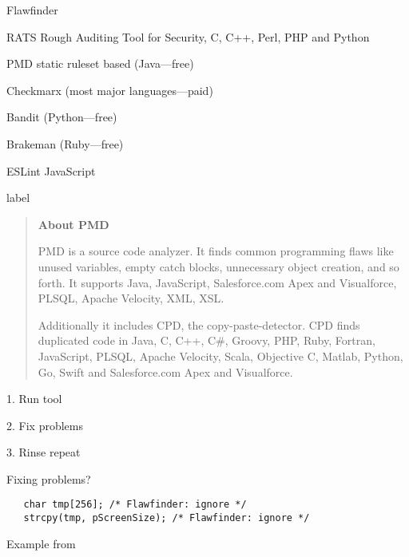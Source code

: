 \documentclass[Screen16to9,17pt]{foils}
\begin{document}
\begin{list1}
\item Flawfinder 
\item RATS Rough Auditing Tool for Security, C, C++, Perl, PHP and Python
\item PMD static ruleset based (Java—free)
\item Checkmarx (most major languages—paid)
\item Bandit (Python—free)
\item Brakeman (Ruby—free)
\item ESLint JavaScript 
\item {\small {}}
\end{list1}label


\begin{quote}{\bf
About PMD}

PMD is a source code analyzer. It finds common programming flaws like unused variables, empty catch blocks, unnecessary object creation, and so forth. It supports Java, JavaScript, Salesforce.com Apex and Visualforce, PLSQL, Apache Velocity, XML, XSL.

Additionally it includes CPD, the copy-paste-detector. CPD finds duplicated code in Java, C, C++, C\#, Groovy, PHP, Ruby, Fortran, JavaScript, PLSQL, Apache Velocity, Scala, Objective C, Matlab, Python, Go, Swift and Salesforce.com Apex and Visualforce.
\end{quote}

\begin{list1}
\item {}
\end{list1}




\begin{list1}
\item 1. Run tool
\item 2. Fix problems
\item 3. Rinse repeat
\end{list1}

Fixing problems?\\
\begin{verbatim}
   char tmp[256]; /* Flawfinder: ignore */
   strcpy(tmp, pScreenSize); /* Flawfinder: ignore */
\end{verbatim}
Example from 
\end{document}

